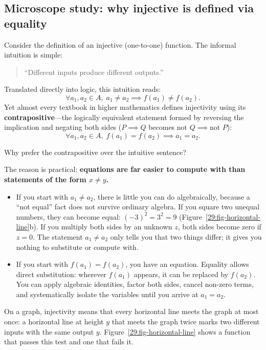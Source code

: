 \subsection{Microscope study: why injective is defined via equality}

Consider the definition of an injective (one-to-one) function. The informal intuition is simple:
\begin{quote}
``Different inputs produce different outputs.''
\end{quote}
Translated directly into logic, this intuition reads:
\[
\forall a_1, a_2 \in A, \; a_1 \neq a_2 \implies f(a_1) \neq f(a_2).
\]
Yet almost every textbook in higher mathematics defines injectivity using its \textbf{contrapositive}---the logically equivalent statement formed by reversing the implication and negating both sides ($P \implies Q$ becomes $\text{not } Q \implies \text{not } P$):
\[
\forall a_1, a_2 \in A, \; f(a_1) = f(a_2) \implies a_1 = a_2.
\]

Why prefer the contrapositive over the intuitive sentence?

The reason is practical: \textbf{equations are far easier to compute with than statements of the form $x \neq y$.}
\begin{itemize}
\item If you start with $a_1 \neq a_2$, there is little you can do algebraically, because a ``not equal'' fact does not survive ordinary algebra. If you square two unequal numbers, they can become equal: $(-3)^2 = 3^2 = 9$ (Figure~\ref{29:fig-horizontal-line}b). If you multiply both sides by an unknown $z$, both sides become zero if $z = 0$. The statement $a_1 \neq a_2$ only tells you that two things differ; it gives you nothing to substitute or compute with.
\item If you start with $f(a_1) = f(a_2)$, you have an equation. Equality allows direct substitution: wherever $f(a_1)$ appears, it can be replaced by $f(a_2)$. You can apply algebraic identities, factor both sides, cancel non-zero terms, and systematically isolate the variables until you arrive at $a_1 = a_2$.
\end{itemize}

On a graph, injectivity means that every horizontal line meets the graph at most once: a horizontal line at height $y$ that meets the graph twice marks two different inputs with the same output $y$. Figure~\ref{29:fig-horizontal-line} shows a function that passes this test and one that fails it.

